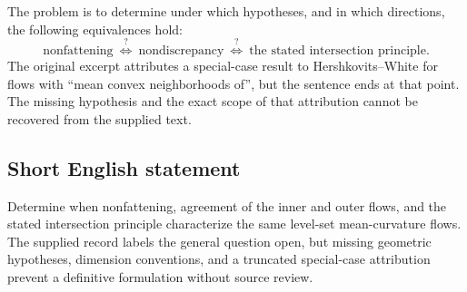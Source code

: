 \documentclass[11pt]{article}
\begin{document}
The problem is to determine under which hypotheses, and in which directions, the following equivalences hold:
\[
\text{nonfattening}
\ \stackrel{?}{\Longleftrightarrow}\
\text{nondiscrepancy}
\ \stackrel{?}{\Longleftrightarrow}\
\text{the stated intersection principle}.
\]
The original excerpt attributes a special-case result to Hershkovits--White for flows with ``mean convex neighborhoods of'', but the sentence ends at that point. The missing hypothesis and the exact scope of that attribution cannot be recovered from the supplied text.
\subsection{Short English statement}
Determine when nonfattening, agreement of the inner and outer flows, and the stated intersection principle characterize the same level-set mean-curvature flows. The supplied record labels the general question open, but missing geometric hypotheses, dimension conventions, and a truncated special-case attribution prevent a definitive formulation without source review.
\end{document}
